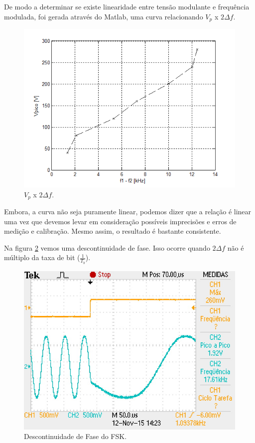 \documentclass[12pt,a4paper]{article}%
\begin{document}
De modo a determinar se existe linearidade entre tensão modulante e frequência modulada, foi gerada através do Matlab, uma curva relacionando $V_p$ x $2 \Delta{f}$.

\begin{figure}[H]
\centering
\includegraphics[scale=0.8]{imagem/curva.png}
\caption{ $V_p$ x $2 \Delta{f}$.}
\label{fig:curva}
\end{figure}

Embora, a curva não seja puramente linear, podemos dizer que a relação é linear uma vez que devemos levar em consideração possíveis imprecisões e erros de medição e calibração. Mesmo assim, o resultado é bastante consistente. 

Na figura \ref{fig:08} vemos uma descontinuidade de fase. Isso ocorre quando $2 \Delta{f}$ não é múltiplo da taxa de bit ($\frac{1}{T_b}$).


\begin{figure}[H]
\centering
\includegraphics[scale=0.5]{imagem/TEK0008}
\caption{Descontinuidade de Fase do FSK.}
\label{fig:08}
\end{figure}
\end{document}
